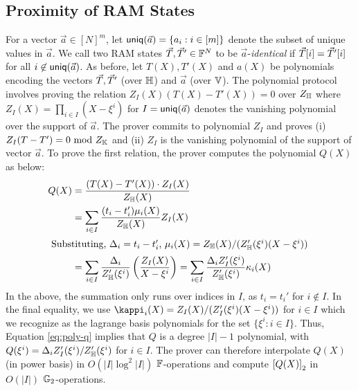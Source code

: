 \subsection{Proximity of RAM States}\label{subsec:proximity-ram}
For a vector $\vec{a}\in [N]^m$, let $\mathsf{uniq}(\vec{{a}})=\{a_i: i\in [m]\}$ denote the subset of unique values in $\vec{a}$. We call two
RAM states $\vec{T}, \vec{T}'\in \mathbb{F}^N$ to be $\vec{a}$-{\em identical} if $\vec{T}[i]=\vec{T}'[i]$ for all $i\not\in\mathsf{uniq}(\vec{{a}})$. As before,
let $T(X),T'(X)$ and $a(X)$ be polynomials encoding the vectors $\vec{T},\vec{T}'$ (over $\mathbb{H}$) and $\vec{a}$ (over $\mathbb{V}$). The
polynomial protocol involves proving the relation $Z_I(X)(T(X) - T'(X)) = 0$ over $Z_{\mathbb{H}}$ where $Z_I(X)=\prod_{i\in I}(X-\xi^i)$
for $I=\mathsf{uniq}(\vec{{a}})$ denotes the vanishing polynomial over the support of $\vec{a}$.
The prover commits to polynomial $Z_I$ and proves (i) $Z_I(T - T') = 0 \text{ mod } Z_{\mathbb{K}}$ and (ii) $Z_I$ is the vanishing
polynomial of the support of vector $\vec{a}$. To prove the first relation, the prover computes the polynomial $Q(X)$ as below:
\begin{align}\label{eq:poly-q}
Q(X) &= \frac{(T(X)-T'(X))\cdot Z_I(X)}{Z_{\mathbb{H}}(X)} \nonumber \\
&= \sum_{i\in I}\frac{(t_i - t_i')\mu_i(X)}{Z_{\mathbb{H}}(X)} Z_I(X) \nonumber \\
\intertext{ Substituting, $\Delta_i=t_i-t_i'$, $\mu_i(X)=Z_\mathbb{H}(X)/(Z_\mathbb{H}'(\xi^i)(X-\xi^i))$ }
&=\sum_{i\in I}\frac{\Delta_i}{Z_{\mathbb{H}}'(\xi^i)}\left(\frac{Z_I(X)}{X-\xi^i}\right) = \sum_{i\in I}\frac{\Delta_i Z_I'(\xi^i)}{Z_{\mathbb{H}}'(\xi^i)}\kappa_i(X)
\end{align}
In the above, the summation only runs over indices in $I$, as $t_i=t_i'$ for $i\not\in I$. In the final equality, we use
$\kappi_i(X) = Z_I(X)/(Z_I'(\xi^i)(X-\xi^i))$ for $i\in I$ which we recognize as the lagrange basis polynomials for the set
$\{\xi^i: i\in I\}$. Thus, Equation \eqref{eq:poly-q} implies that $Q$ is a degree $|I|-1$ polynomial, with
$Q(\xi^i)=\Delta_i Z_I'(\xi^i)/Z_\mathbb{H}'(\xi^i)$ for $i\in I$. The prover can therefore interpolate $Q(X)$ (in power basis)
in $O(|I|\log^2 |I|)$ $\mathbb{F}$-operations and compute $\left[{Q(X)}\right]_2$ in $O(|I|)$ $\mathbb{G}_2$-operations.

